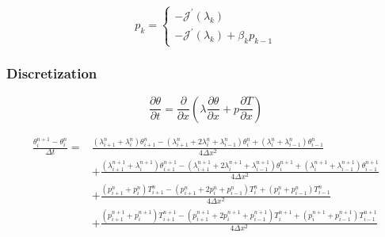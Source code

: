 \documentclass[UTF-8]{article}
\begin{document}
\begin{equation}
	p_k =
	\left\{
	\begin{array}{l}
		-\mathcal{J}^\prime(\lambda_k) \\
		-\mathcal{J}^\prime(\lambda_k) + \beta_k p_{k-1}
	\end{array}
	\right.
\end{equation}

\subsubsection{Discretization}

\begin{equation}
	\frac{\partial \theta}{\partial t} = \frac{\partial}{\partial x} \left( \lambda \frac{\partial \theta}{\partial x} + p \frac{\partial T}{\partial x} \right)
\end{equation}

\begin{align}
	\frac{\theta_{i}^{n+1} - \theta_{i}^{n}}{\Delta t} = & \frac{(\lambda_{i+1}^{n} + \lambda_{i}^{n}) \theta_{i+1}^{n} - (\lambda_{i+1}^{n} + 2 \lambda_{i}^{n} + \lambda_{i-1}^{n}) \theta_{i}^{n} + (\lambda_{i}^{n} + \lambda_{i-1}^{n}) \theta_{i-1}^{n}}{4 \Delta x^2} \nonumber \\
	& + \frac{(\lambda_{i+1}^{n+1} + \lambda_{i}^{n+1}) \theta_{i+1}^{n+1} - (\lambda_{i+1}^{n+1} + 2 \lambda_{i}^{n+1} + \lambda_{i-1}^{n+1}) \theta_{i}^{n+1} + (\lambda_{i}^{n+1} + \lambda_{i-1}^{n+1}) \theta_{i-1}^{n+1}}{4 \Delta x^2} \nonumber \\
	& + \frac{(p_{i+1}^{n} + p_{i}^{n}) T_{i+1}^{n} - (p_{i+1}^{n} + 2 p_{i}^{n} + p_{i-1}^{n}) T_{i}^{n} + (p_{i}^{n} + p_{i-1}^{n}) T_{i-1}^{n}}{4 \Delta x^2} \nonumber \\
	& + \frac{(p_{i+1}^{n+1} + p_{i}^{n+1}) T_{i+1}^{n+1} - (p_{i+1}^{n+1} + 2 p_{i}^{n+1} + p_{i-1}^{n+1}) T_{i}^{n+1} + (p_{i}^{n+1} + p_{i-1}^{n+1}) T_{i-1}^{n+1}}{4 \Delta x^2} \nonumber
\end{align}
\end{document}
